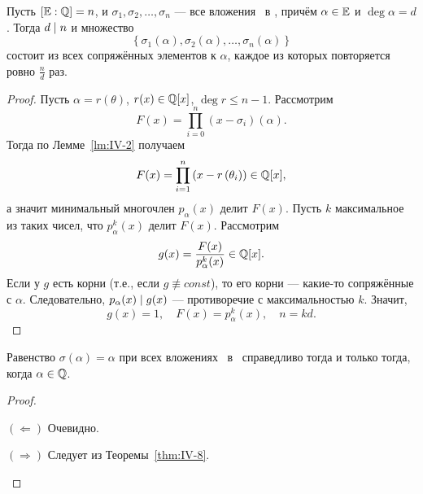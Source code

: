 \begin{ntheorem}
\label{thm:IV-8}
    Пусть $[\mathbb{E} : \mathbb{Q}] = n$, и $\sigma_1, \sigma_2, \dots, \sigma_n$ --- все вложения \EE~в \CC, причём $\alpha \in \mathbb{E}$ и $\deg{\alpha} = d$. Тогда $d \mid n$ и множество
    \[
        \left\{ \sigma_1(\alpha), \sigma_2(\alpha), \dots, \sigma_n(\alpha) \right\}
    \]
    состоит из всех сопряжённых элементов к $\alpha$, каждое из которых повторяется ровно $\frac{n}{d}$ раз.
\end{ntheorem}
\begin{proof}
    Пусть $\alpha = r(\theta)$, $r(x) \in \mathbb{Q}[x]$, $\deg{r} \le n-1$. Рассмотрим 
    \[
        F(x) = \prod_{i=0}^n \left( x-\sigma_i \right)(\alpha).
    \]
    Тогда по Лемме~\ref{lm:IV-2} получаем
    \[
        F(x) = \prod_{i=1}^n \left( x - r\left(\theta_i\right)\right) \in \mathbb{Q}[x],
    \]
    а значит минимальный многочлен $p_{\alpha}(x)$ делит $F(x)$. 
    Пусть $k$ максимальное из таких чисел, что $p_{\alpha}^k(x)$ делит $F(x)$. Рассмотрим
    \[
        g(x) = \frac{F(x)}{p_{\alpha}^k(x)} \in \mathbb{Q}[x].
    \]
    Если у $g$ есть корни (т.е., если $g \not\equiv const$), то его корни --- какие-то сопряжённые с $\alpha$. Следовательно, $p_\alpha(x) \mid g(x)$ --- противоречие с максимальностью $k$. Значит,
    \[
        g(x) = 1, \quad F(x)=p_{\alpha}^k(x), \quad n = kd.
    \]
\end{proof}

\begin{ncorollary}
\label{crl:IV-1}
    Равенство $\sigma(\alpha) = \alpha$ при всех вложениях \EE~в \CC~справедливо тогда и только тогда, когда $\alpha \in \mathbb{Q}$.
\end{ncorollary}
\begin{proof}
\hfill
    \begin{statesp}
        \item[$(\Leftarrow)$] Очевидно.
        \item[$(\Rightarrow)$] Следует из Теоремы~\ref{thm:IV-8}.
    \end{statesp}
\end{proof}
